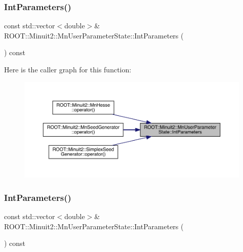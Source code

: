 \mbox{\label{classROOT_1_1Minuit2_1_1MnUserParameterState_a090cbf6f0d6efe452e90e4d9c4425d94}} 
\subsubsection{\texorpdfstring{IntParameters()}{IntParameters()}\hspace{0.1cm}{\footnotesize\ttfamily [1/2]}}
{\footnotesize\ttfamily const std\+::vector$<$double$>$\& R\+O\+O\+T\+::\+Minuit2\+::\+Mn\+User\+Parameter\+State\+::\+Int\+Parameters (\begin{DoxyParamCaption}{ }\end{DoxyParamCaption}) const\hspace{0.3cm}{\ttfamily [inline]}}

Here is the caller graph for this function\+:\nopagebreak
\begin{figure}[H]
\begin{center}
\leavevmode
\includegraphics[width=350pt]{d3/de0/classROOT_1_1Minuit2_1_1MnUserParameterState_a090cbf6f0d6efe452e90e4d9c4425d94_icgraph}
\end{center}
\end{figure}
\mbox{\label{classROOT_1_1Minuit2_1_1MnUserParameterState_a090cbf6f0d6efe452e90e4d9c4425d94}} 
\subsubsection{\texorpdfstring{IntParameters()}{IntParameters()}\hspace{0.1cm}{\footnotesize\ttfamily [2/2]}}
{\footnotesize\ttfamily const std\+::vector$<$double$>$\& R\+O\+O\+T\+::\+Minuit2\+::\+Mn\+User\+Parameter\+State\+::\+Int\+Parameters (\begin{DoxyParamCaption}{ }\end{DoxyParamCaption}) const\hspace{0.3cm}{\ttfamily [inline]}}

